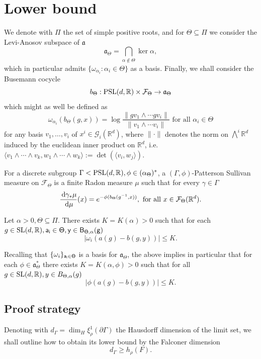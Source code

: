 \documentclass{report}
\begin{document}
\chapter{Lower bound}
We denote with $\Pi$ the set of simple positive roots, and for $\Theta \subseteq \Pi$ we consider the Levi-Anosov subspace of $\mathfrak a$
\[
    \mathfrak a_\Theta = \bigcap_{\alpha \notin \Theta} \ker \alpha,
\]
which in particular admits $\{ \omega_{\alpha_i} : \alpha_i \in \Theta \}$ as a basis.
Finally, we shall consider the Busemann cocycle
\[
    b_\Theta : \operatorname{{\mathrm{PSL}}}(d, \mathbb R) \times \mathcal F_\Theta \to \mathfrak a_\Theta
\]
which might as well be defined as
\[
    \omega_{\alpha_i}(b_\Theta(g, x)) =
    \log \frac{\| g v_1 \wedge \cdots g v_i \|}{ \| v_1 \wedge \cdots v_i \| }
    \text{ for all } \alpha_i \in \Theta
\]
for any basis $v_1, \ldots, v_i$ of $x^i \in \mathcal G_i(\mathbb R^d)$, where $\| \cdot \|$ denotes the norm on $\bigwedge^i \mathbb R^d$ induced by the euclidean inner product on $\mathbb R^d$, 
i.e.\ $ \langle v_1 \wedge \cdots \wedge v_k, w_1 \wedge \cdots \wedge w_k \rangle := \det(\langle v_i, w_j \rangle)$.
\begin{definition}
    For a discrete subgroup $\Gamma < \operatorname{{\mathrm{PSL}}}(d, \mathbb R), \phi \in (\alpha_\Theta)^*$,
    a $(\Gamma, \phi)$-Patterson Sullivan measure on $\mathcal F_\Theta$ is a finite Radon measure $\mu$ such that for every $\gamma \in \Gamma$
    \[
        \frac{\,\mathrm{d}\gamma_* \mu}{\,\mathrm{d}\mu}(x) = e^{-\phi(b_\Theta(g^{-1},x))}, \text{ for all } x \in \mathcal F_\Theta(\mathbb R^d).
    \]
\end{definition}

\begin{lemma}\label{lem:busemann}
Let $\alpha > 0, \Theta \subseteq \Pi$.
There exists $K = K(\alpha) > 0$ such that for each $g \in \operatorname{{\mathrm{SL}}}(d, \mathbb R), \sf{a_i} \in \Theta, y \in B_{\Theta, \alpha}(g)$
\[
    |\omega_i (a(g) - b(g, y))| \leq K.
\]
\end{lemma}
Recalling that $\{ \omega_i \}_{\sf a_i \in \Theta} $ is a basis for $\mathfrak a_\Theta$, the above implies in particular that for each $\phi \in \mathfrak a_\Theta^*$ there exists $K = K(\alpha, \phi) > 0$ such that for all $g \in \operatorname{{\mathrm{SL}}}(d, \mathbb R), y \in B_{\Theta, \alpha}(g)$
\[
    |\phi (a(g) - b(g, y))| \leq K.
\]
\section{Proof strategy}
Denoting with $d_\Gamma = \dim_H \xi_\rho^1(\partial \Gamma)$ the Hausdorff  dimension of the limit set, we shall outline how to obtain its lower bound by the Falconer dimension
\[
    d_\Gamma \geq h_\rho(F).
\]
\end{document}
